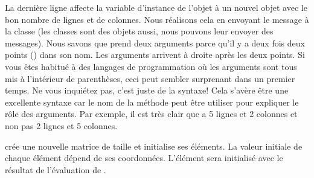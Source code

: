 \documentclass[a4paper,10pt,twoside]{book}
\begin{document}
La dernière ligne affecte la variable d'instance  de l'objet
 à un nouvel objet  avec le bon nombre de lignes et de colonnes.
Nous réalisons cela en envoyant le message  à la classe  (les classes sont des objets aussi, nous pouvons leur envoyer des messages).
Nous savons que  prend deux arguments parce qu'il y a deux fois deux points (\ct{:}) dans son nom. Les arguments arrivent à droite après les deux points.
Si vous êtes habitué à des langages de programmation où les arguments sont tous mis à l'intérieur de parenthèses, ceci peut sembler surprenant dans un premier temps. Ne vous inquiétez pas, c'est juste de la syntaxe!
Cela s'avère être une excellente syntaxe car le nom de la méthode peut être utiliser pour expliquer le rôle des arguments. Par exemple, il est très clair que  a 5 lignes et 2 colonnes et non pas 2 lignes et 5 colonnes.

 crée une nouvelle matrice de taille  et initialise ses éléments. La valeur initiale de chaque élément dépend de ses coordonnées. L'élément  sera initialisé avec le résultat de l'évaluation de .  



\end{document}
